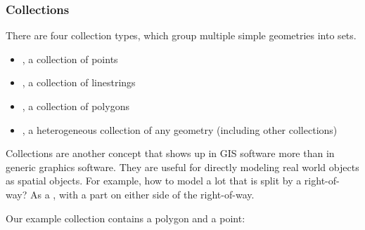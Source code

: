 \documentclass[a4paper,11pt,english]{sphinxmanual}
\begin{document}
\subsubsection{Collections}
\label{\detokenize{basic:collections}}
There are four collection types, which group multiple simple geometries into sets.
\begin{itemize}
\item {} 
, a collection of points

\item {} 
, a collection of linestrings

\item {} 
, a collection of polygons

\item {} 
, a heterogeneous collection of any geometry (including other collections)

\end{itemize}

Collections are another concept that shows up in GIS software more than in generic graphics software. They are useful for directly modeling real world objects as spatial objects. For example, how to model a lot that is split by a right-of-way? As a , with a part on either side of the right-of-way.


Our example collection contains a polygon and a point:

\begin{sphinxVerbatim}[commandchars=\\\{\}]
  
   
     
\end{sphinxVerbatim}

\begin{sphinxVerbatim}[commandchars=\\\{\}]
          
\end{sphinxVerbatim}
\end{document}
